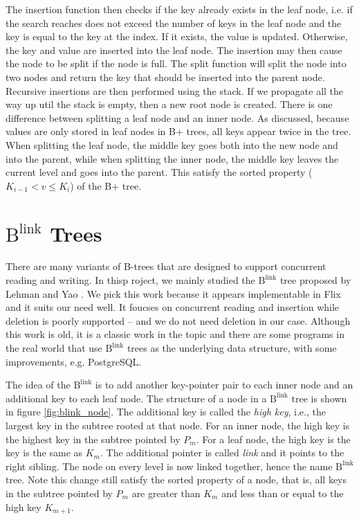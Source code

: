 \documentclass[11pt]{report}
\theoremstyle{definition}
\begin{document}
The insertion function then checks if the key already exists in the leaf node, i.e. if the search reaches does not exceed the number of keys in the leaf node and the key is equal to the key at the index. If it exists, the value is updated. Otherwise, the key and value are inserted into the leaf node. The insertion may then cause the node to be split if the node is full. The split function will split the node into two nodes and return the key that should be inserted into the parent node. Recursive insertions are then performed using the stack. If we propagate all the way up util the stack is empty, then a new root node is created. There is one difference between splitting a leaf node and an inner node. As discussed, because values are only stored in leaf nodes in B+ trees, all keys appear twice in the tree. When splitting the leaf node, the middle key goes both into the new node and into the parent, while when splitting the inner node, the middle key leaves the current level and goes into the parent. This satisfy the sorted property ($K_{i-1} < v \leq K_i$) of the B+ tree.

\section{$\text{B}^{\text{link}}$ Trees}

There are many variants of B-trees that are designed to support concurrent reading and writing. In thisp roject, we mainly studied the $\text{B}^{\text{link}}$ tree proposed by Lehman and Yao \cite{10.1145/319628.319663}. We pick this work because it appears implementable in Flix and it suits our need well. It foucses on concurrent reading and insertion while deletion is poorly supported -- and we do not need deletion in our case. Although this work is old, it is a classic work in the topic and there are some programs in the real world that use $\text{B}^{\text{link}}$ trees as the underlying data structure, with some improvements, e.g. PostgreSQL.

The idea of the $\text{B}^{\text{link}}$ is to add another key-pointer pair to each inner node and an additional key to each leaf node. The structure of a node in a $\text{B}^{\text{link}}$ tree is shown in figure \ref{fig:blink_node}. The additional key is called the \textit{high key}, i.e., the largest key in the subtree rooted at that node. For an inner node, the high key is the highest key in the subtree pointed by $P_m$. For a leaf node, the high key is the key is the same as $K_m$. The additional pointer is called \textit{link} and it points to the right sibling. The node on every level is now linked together, hence the name $\text{B}^{\text{link}}$ tree. Note this change still satisfy the sorted property of a node, that is, all keys in the subtree pointed by $P_m$ are greater than $K_m$ and less than or equal to the high key $K_{m+1}$.
\end{document}
